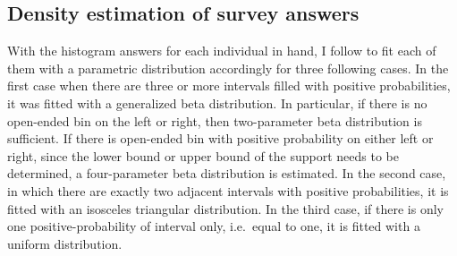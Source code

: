 
\hypertarget{density-estimation-and-variables}{%
\subsection{Density estimation of survey answers}\label{density-estimation-and-variables}}


With the histogram answers for each individual in hand, I follow
\cite{engelberg_comparing_2009} to fit each of them with a parametric
distribution accordingly for three following cases. In the first case
when there are three or more intervals filled with positive
probabilities, it was fitted with a generalized beta distribution. In
particular, if there is no open-ended bin on the left or right, then
two-parameter beta distribution is sufficient. If there is
open-ended bin with positive probability on either left or right, since the lower bound or upper
bound of the support needs to be determined, a four-parameter beta
distribution is estimated. In the second case, in which there are
exactly two adjacent intervals with positive probabilities, it is fitted
with an isosceles triangular distribution. In the third case, if there
is only one positive-probability of interval only, i.e.~equal to one, it
is fitted with a uniform distribution.

\begin{comment}
Since subjective moments such as variance is calculated based on the
estimated distribution, it is important to make sure the estimation
assumptions of the density distribution do not mechanically distort my
cross-sectional patterns of the estimated moments. This is the most
obviously seen in the tail risk measure, skewness. The assumption of log
normality of income process, common in the literature (See again
\cite{blundell_consumption_2008}), implicitly assume zero skewness,
i.e.~that the income increase and decrease from its mean are equally
likely. This may not be the case in our surveyed density for many
individuals. In order to account for this possibility, the assumed
density distribution should be flexible enough to allow for different
shapes of subjective distribution. Beta distribution fits this purpose
well. Of course, in the case of uniform and isosceles triangular
distribution, the skewness is zero by default.

Since the microdata provided in the SCE website already includes the
estimated mean, variance and IQR by the staff economists following the
exact same approach, I directly use their estimates for these moments.
At the same time, for the measure of tail-risk, i.e.~skewness, as not
provided, I use my own estimates. I also confirm that my estimates and
theirs for the first two moments are correlated with a coefficient of
0.9.

\end{comment}

